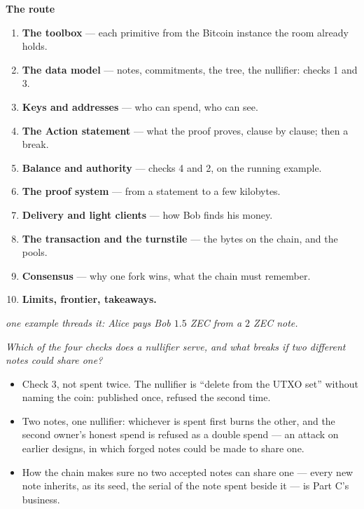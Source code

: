 \documentclass[11pt]{article}
\newcounter{board}
\newenvironment{board}[2]{\clearpage\stepcounter{board}%
  \sbox{\bdlabel}{\small\color{arbdim}#2}%
  \noindent\parbox[b]{\dimexpr\textwidth-\wd\bdlabel-1em\relax}{\raggedright
    \color{arb}\large\bfseries #1}\hfill\usebox{\bdlabel}\par
  \vspace{2pt}{\color{arb!40}\hrule}\vspace{4pt}}{\par}
\newcommand{\shead}[1]{\par\smallskip{\small\bfseries\color{arbdim}#1}\par\nopagebreak}
\newcommand{\Write}{\shead{Write}}
\newcommand{\Ask}{\shead{Ask}}
\newcommand{\Answer}{\clearpage\shead{Answer}}
\begin{document}
\begin{board}{The route}{all four}
\Write
{\small
\begin{enumerate}
  \item \textbf{The toolbox} --- each primitive from the Bitcoin instance
    the room already holds.
  \item \textbf{The data model} --- notes, commitments, the tree, the
    nullifier: checks 1 and 3.
  \item \textbf{Keys and addresses} --- who can spend, who can see.
  \item \textbf{The Action statement} --- what the proof proves, clause by
    clause; then a break.
  \item \textbf{Balance and authority} --- checks 4 and 2, on the running
    example.
  \item \textbf{The proof system} --- from a statement to a few kilobytes.
  \item \textbf{Delivery and light clients} --- how Bob finds his money.
  \item \textbf{The transaction and the turnstile} --- the bytes on the
    chain, and the pools.
  \item \textbf{Consensus} --- why one fork wins, what the chain must
    remember.
  \item \textbf{Limits, frontier, takeaways.}
\end{enumerate}}

\emph{one example threads it: Alice pays Bob $1.5$ ZEC from a $2$ ZEC
note.}
\Ask
\emph{Which of the four checks does a nullifier serve, and what breaks if
two different notes could share one?}
\Answer
\begin{itemize}
  \item Check 3, not spent twice. The nullifier is ``delete from the UTXO
    set'' without naming the coin: published once, refused the second
    time.
  \item Two notes, one nullifier: whichever is spent first burns the other,
    and the second owner's honest spend is refused as a double spend ---
    an attack on earlier designs, in which forged notes could be made to
    share one.
  \item How the chain makes sure no two accepted notes can share one ---
    every new note inherits, as its seed, the serial of the note spent
    beside it --- is Part C's business.
\end{itemize}
\end{board}

\end{document}
